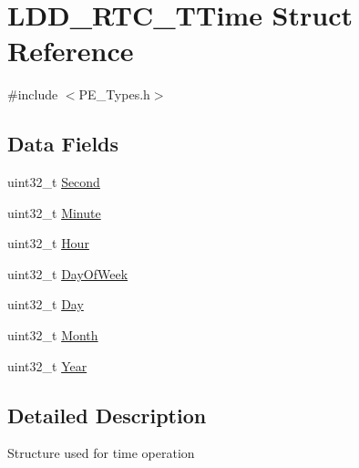 \hypertarget{struct_l_d_d___r_t_c___t_time}{\section{L\-D\-D\-\_\-\-R\-T\-C\-\_\-\-T\-Time Struct Reference}
\label{struct_l_d_d___r_t_c___t_time}
}


{\ttfamily \#include $<$P\-E\-\_\-\-Types.\-h$>$}

\subsection*{Data Fields}
\begin{DoxyCompactItemize}
\item 
uint32\-\_\-t \hyperlink{struct_l_d_d___r_t_c___t_time_ab6c770706c18542e856d56398850ac9e}{Second}
\item 
uint32\-\_\-t \hyperlink{struct_l_d_d___r_t_c___t_time_a5cd7a1478dd5dd319fb5837bfbf5459f}{Minute}
\item 
uint32\-\_\-t \hyperlink{struct_l_d_d___r_t_c___t_time_ade2d4bed82069483da14cfe2ede6fef9}{Hour}
\item 
uint32\-\_\-t \hyperlink{struct_l_d_d___r_t_c___t_time_a43ba06409c4d35f48d732cb61ff5aed0}{Day\-Of\-Week}
\item 
uint32\-\_\-t \hyperlink{struct_l_d_d___r_t_c___t_time_acc1084e0fd686c588a2947c2f109634f}{Day}
\item 
uint32\-\_\-t \hyperlink{struct_l_d_d___r_t_c___t_time_a2de1da3c8e42665975c2469125b04dfd}{Month}
\item 
uint32\-\_\-t \hyperlink{struct_l_d_d___r_t_c___t_time_a16fbfb74b239e4b5e1889fe19d025d5e}{Year}
\end{DoxyCompactItemize}


\subsection{Detailed Description}
Structure used for time operation 

